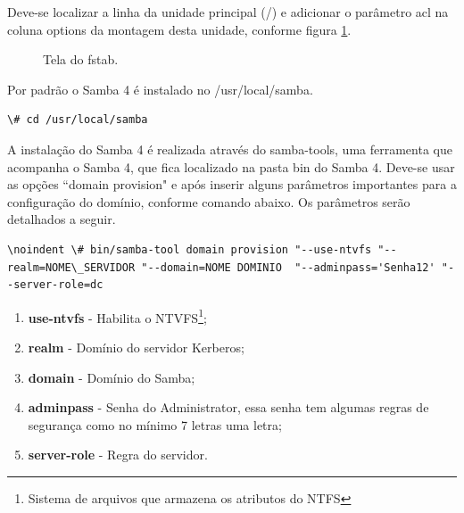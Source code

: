 Deve-se localizar a linha da unidade principal (/) e adicionar o parâmetro acl na coluna options da montagem desta unidade, conforme figura \ref{fstab}.

\begin{figure}[ht]
   	\centering
   	\caption{Tela do fstab.}
    \label{fstab}
\end{figure}

Por padrão o Samba 4 é instalado no /usr/local/samba.

\begin{lstlisting}
\# cd /usr/local/samba
\end{lstlisting}

A instalação do Samba 4 é realizada através do samba-tools, uma ferramenta que acompanha o Samba 4, que fica localizado na pasta bin do Samba 4. Deve-se usar as opções ``domain provision" e após inserir alguns parâmetros importantes para a configuração do domínio, conforme comando abaixo. Os parâmetros serão detalhados a seguir.

\begin{lstlisting}
\noindent \# bin/samba-tool domain provision "--use-ntvfs "--realm=NOME\_SERVIDOR "--domain=NOME DOMINIO  "--adminpass='Senha12' "--server-role=dc
\end{lstlisting}

\begin{enumerate}
	\item \textbf{use-ntvfs} - Habilita o NTVFS\footnote[3]{Sistema de arquivos que armazena os atributos do NTFS};
	\item \textbf{realm} - Domínio do servidor Kerberos;
	\item \textbf{domain} - Domínio do Samba;
	\item \textbf{adminpass} - Senha do Administrator, essa senha tem algumas regras de segurança como no mínimo 7 letras uma letra;
	\item \textbf{server-role} - Regra do servidor.
\end{enumerate}

